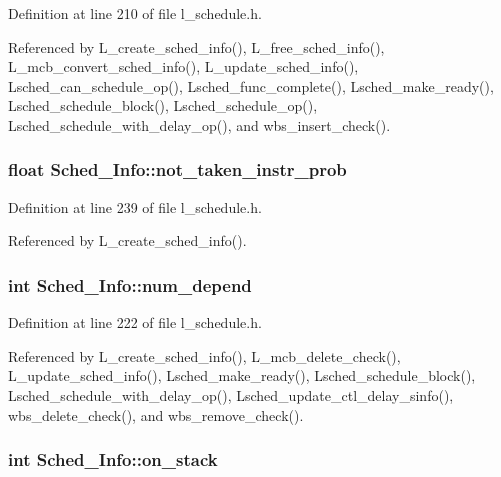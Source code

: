 Definition at line 210 of file l\_\-schedule.h.

Referenced by L\_\-create\_\-sched\_\-info(), L\_\-free\_\-sched\_\-info(), L\_\-mcb\_\-convert\_\-sched\_\-info(), L\_\-update\_\-sched\_\-info(), Lsched\_\-can\_\-schedule\_\-op(), Lsched\_\-func\_\-complete(), Lsched\_\-make\_\-ready(), Lsched\_\-schedule\_\-block(), Lsched\_\-schedule\_\-op(), Lsched\_\-schedule\_\-with\_\-delay\_\-op(), and wbs\_\-insert\_\-check().
\subsubsection{\setlength{\rightskip}{0pt plus 5cm}float \bf{Sched\_\-Info::not\_\-taken\_\-instr\_\-prob}}\label{structSched__Info_d62e2167e7f6a487d6d2fc7009ee85de}




Definition at line 239 of file l\_\-schedule.h.

Referenced by L\_\-create\_\-sched\_\-info().
\subsubsection{\setlength{\rightskip}{0pt plus 5cm}int \bf{Sched\_\-Info::num\_\-depend}}\label{structSched__Info_42a75fe06a20eb4c61154fe00bce5ef2}




Definition at line 222 of file l\_\-schedule.h.

Referenced by L\_\-create\_\-sched\_\-info(), L\_\-mcb\_\-delete\_\-check(), L\_\-update\_\-sched\_\-info(), Lsched\_\-make\_\-ready(), Lsched\_\-schedule\_\-block(), Lsched\_\-schedule\_\-with\_\-delay\_\-op(), Lsched\_\-update\_\-ctl\_\-delay\_\-sinfo(), wbs\_\-delete\_\-check(), and wbs\_\-remove\_\-check().
\subsubsection{\setlength{\rightskip}{0pt plus 5cm}int \bf{Sched\_\-Info::on\_\-stack}}\label{structSched__Info_d0fdbcdfa6b46f8e11093b4aee43a9e6}




